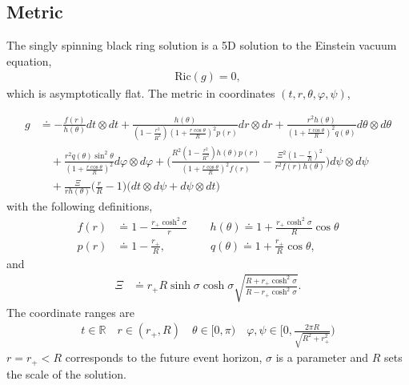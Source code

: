 \documentclass[11pt]{article}
\renewcommand{\phi}{\varphi}
\begin{document}
\subsection{Metric}
 The singly spinning black ring solution is a 5D solution to the Einstein vacuum equation, 
\begin{align}
\mathrm{Ric}(g)=0,
\end{align} 
which is asymptotically flat. The metric in coordinates $(t,r,\theta,\phi,\psi)$,
 \iffalse
 \begin{align}
 g\doteq\begin{pmatrix}
 -\frac{f(r)}{h(\theta)}&0&0&0&\frac{\Xi}{rh(\theta)}\Big(\frac{r}{R}-1\Big)\\
 0&\frac{h(\theta)}{(1-\frac{r^2}{R^2})(1+\frac{r\cos\theta}{R})^2p(r)}&0&0&0\\
 0&0&\frac{r^2h(\theta)}{(1+\frac{r\cos\theta}{R})^2q(\theta)}&0&0\\
 0&0&0&\frac{r^2q(\theta)\sin^2\theta}{(1+\frac{r\cos\theta}{R})^2}&0\\
\frac{\Xi}{rh(\theta)}\Big(\frac{r}{R}-1\Big) &0&0&0&\frac{R^2(1-\frac{r^2}{R^2})h(\theta)p(r)}{(1+\frac{r\cos\theta}{R})^2f(r)}-\frac{K^2(1-\frac{r}{R})^2}{r^2f(r)h(\theta)}
 \end{pmatrix}
 \end{align}
 \fi
 \begin{align}
 g&\doteq-\frac{f(r)}{h(\theta)}dt\otimes dt+\frac{h(\theta)}{(1-\frac{r^2}{R^2})(1+\frac{r\cos\theta}{R})^2p(r)}dr\otimes dr+\frac{r^2h(\theta)}{(1+\frac{r\cos\theta}{R})^2q(\theta)}d\theta\otimes d\theta\\
 &\nonumber\quad+\frac{r^2q(\theta)\sin^2\theta}{(1+\frac{r\cos\theta}{R})^2}d\phi\otimes d\phi+\Big(\frac{R^2(1-\frac{r^2}{R^2})h(\theta)p(r)}{(1+\frac{r\cos\theta}{R})^2f(r)}-\frac{\Xi^2(1-\frac{r}{R})^2}{r^2f(r)h(\theta)}\Big)d\psi\otimes d\psi\nonumber\\
 &\nonumber\quad+\frac{\Xi}{rh(\theta)}\Big(\frac{r}{R}-1\Big)\big(dt\otimes d\psi+d\psi\otimes dt\big)\nonumber
 \end{align}
 with the following definitions, 
 \begin{align}
 f(r)&\doteq1-\frac{r_+\cosh^2\sigma}{r}\qquad h(\theta)\doteq1+\frac{r_+\cosh^2\sigma}{R}\cos\theta\\
 p(r)&\doteq1-\frac{r_+}{R},\qquad\qquad q(\theta)\doteq1+\frac{r_+}{R}\cos\theta,
 \end{align}
 and
 \begin{align}
  \Xi&\doteq r_+R\sinh\sigma\cosh\sigma\sqrt{\frac{R+r_+\cosh^2\sigma}{R-r_+\cosh^2\sigma}}.
 \end{align}
 The coordinate ranges are
 \begin{align}
 t\in \mathbb{R}\quad r\in (r_+,R)\quad \theta\in [0,\pi)\quad \phi,\psi\in \Big[0,\frac{2\pi R}{\sqrt{R^2+r_+^2}}\Big)
 \end{align}
 $r=r_+<R$ corresponds to the future event horizon, $\sigma$ is a parameter and $R$ sets the scale of the solution. \\
 
\end{document}
